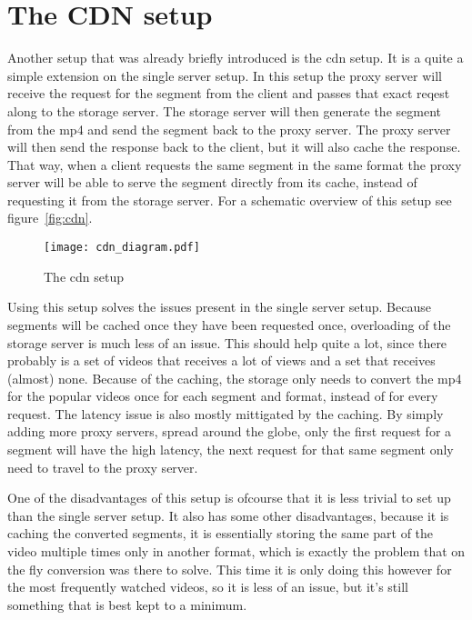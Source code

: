 \documentclass[twoside,openright]{uva-bachelor-thesis}
\begin{document}
\section{The CDN setup}
Another setup that was already briefly introduced is the \gls{cdn} setup. It is
a quite a simple extension on the single server setup. In this setup the proxy
server will receive the request for the segment from the client and passes that
exact reqest along to the storage server. The storage server will then generate
the segment from the mp4 and send the segment back to the proxy server.  The
proxy server will then send the response back to the client, but it will also
cache the response. That way, when a client requests the same segment in the
same format the proxy server will be able to serve the segment directly from its
cache, instead of requesting it from the storage server. For a schematic
overview of this setup see figure~\vref{fig:cdn}.

\begin{figure}[h]
    \texttt{[image: cdn\_diagram.pdf]}
    \caption{The \gls{cdn} setup}\label{fig:cdn}
\end{figure}

Using this setup solves the issues present in the single server
setup. Because segments will be cached once they have been requested once,
overloading of the storage server is much less of an issue. This should help
quite a lot, since there probably is a set of videos that receives a lot of
views and a set that receives (almost) none. Because of the caching, the storage
only needs to convert the mp4 for the popular videos once for each segment and
format, instead of for every request.
The latency issue is also mostly
mittigated by the caching. By simply adding more proxy servers, spread around
the globe, only the first request for a segment will have the high latency, the
next request for that same segment only need to travel to the proxy server.

One of the disadvantages of this setup is ofcourse that it is less trivial to
set up than the single server setup. It also has some other disadvantages,
because it is caching the converted segments, it is essentially storing the same
part of the video multiple times only in another format, which is exactly the
problem that on the fly conversion was there to solve. This time it is only
doing this however for the most frequently watched videos, so it is less of an
issue, but it's still something that is best kept to a minimum.
\end{document}

